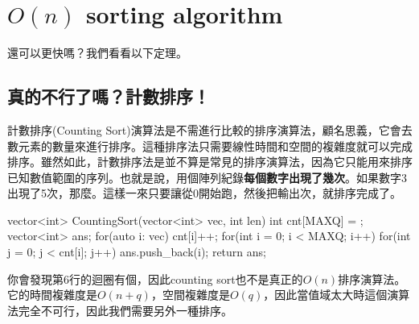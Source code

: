 \section{$O(n)$ sorting algorithm}

還可以更快嗎？我們看看以下定理。


\subsection{真的不行了嗎？計數排序！}
計數排序(Counting Sort)演算法是不需進行比較的排序演算法，顧名思義，它會去數元素的數量來進行排序。這種排序法只需要線性時間和空間的複雜度就可以完成排序。雖然如此，計數排序法是並不算是常見的排序演算法，因為它只能用來排序已知數值範圍的序列。也就是說，用個陣列紀錄\textbf{每個數字出現了幾次}。如果數字3出現了5次，那麼。這樣一來只要讓從0開始跑，然後把輸出次，就排序完成了。
\begin{C++}
vector<int> CountingSort(vector<int> vec, int len){
    int cnt[MAXQ] = {};
    vector<int> ans;
    for(auto i: vec)
        cnt[i]++;
    for(int i = 0; i < MAXQ; i++)
        for(int j = 0; j < cnt[i]; j++)
            ans.push_back(i);
    return ans;
}
\end{C++}
你會發現第6行的迴圈有個，因此counting sort也不是真正的$O(n)$排序演算法。它的時間複雜度是$O(n+q)$，空間複雜度是$O(q)$，因此當值域太大時這個演算法完全不可行，因此我們需要另外一種排序。

